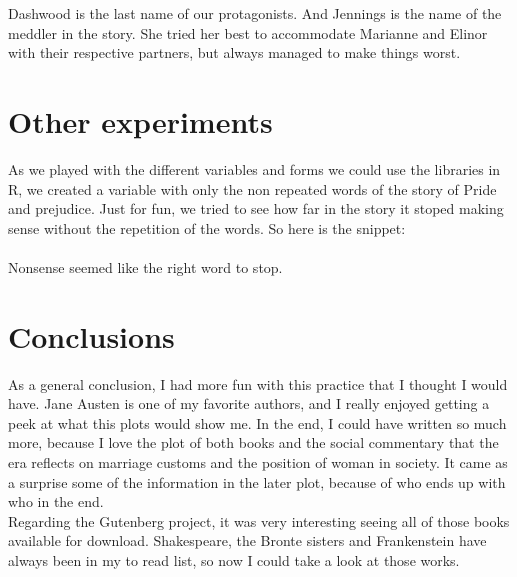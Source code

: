 \documentclass{article}
\begin{document}
Dashwood is the last name of our protagonists. And Jennings is the name of the meddler in the story. She tried her best to accommodate Marianne and Elinor with their respective partners, but always managed to make things worst.\\

\section{Other experiments}

As we played with the different variables and forms we could use the libraries in R, we created a variable with only the non repeated words of the story of Pride and prejudice. Just for fun, we tried to see how far in the story it stoped making sense without the repetition of the words. So here is the snippet: \\

 \\

Nonsense seemed like the right word to stop.\\

\section{Conclusions}

As a general conclusion, I had more fun with this practice that I thought I would have. Jane Austen is one of my favorite authors, and I really enjoyed getting a peek at what this plots would show me. In the end, I could have written so much more, because I love the plot of both books and the social commentary that the era reflects on marriage customs and the position of woman in society. It came as a surprise some of the information in the later plot, because of who ends up with who in the end. \\

Regarding the Gutenberg project, it was very interesting seeing all of those books available for download. Shakespeare, the Bronte sisters and Frankenstein have always been in my to read list, so now I could take a look at those works.\\








 
\end{document}
